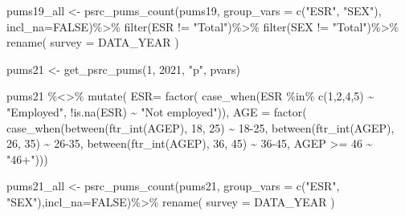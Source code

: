 \documentclass[
  12pt,
]{article}
\newenvironment{Shaded}{\begin{snugshade}}{\end{snugshade}}
\newcommand{\AttributeTok}[1]{\textcolor[rgb]{0.77,0.63,0.00}{#1}}
\newcommand{\ConstantTok}[1]{\textcolor[rgb]{0.00,0.00,0.00}{#1}}
\newcommand{\DecValTok}[1]{\textcolor[rgb]{0.00,0.00,0.81}{#1}}
\newcommand{\FunctionTok}[1]{\textcolor[rgb]{0.00,0.00,0.00}{#1}}
\newcommand{\NormalTok}[1]{#1}
\newcommand{\OtherTok}[1]{\textcolor[rgb]{0.56,0.35,0.01}{#1}}
\newcommand{\SpecialCharTok}[1]{\textcolor[rgb]{0.00,0.00,0.00}{#1}}
\newcommand{\StringTok}[1]{\textcolor[rgb]{0.31,0.60,0.02}{#1}}
\begin{document}
\begin{Shaded}
\begin{Highlighting}[]
\NormalTok{pums19\_all }\OtherTok{\textless{}{-}} \FunctionTok{psrc\_pums\_count}\NormalTok{(pums19, }\AttributeTok{group\_vars =} \FunctionTok{c}\NormalTok{(}\StringTok{"ESR"}\NormalTok{, }\StringTok{"SEX"}\NormalTok{), }\AttributeTok{incl\_na=}\ConstantTok{FALSE}\NormalTok{)}\SpecialCharTok{\%\textgreater{}\%}
  \FunctionTok{filter}\NormalTok{(ESR }\SpecialCharTok{!=} \StringTok{"Total"}\NormalTok{)}\SpecialCharTok{\%\textgreater{}\%}
  \FunctionTok{filter}\NormalTok{(SEX }\SpecialCharTok{!=} \StringTok{"Total"}\NormalTok{)}\SpecialCharTok{\%\textgreater{}\%}
  \FunctionTok{rename}\NormalTok{(}
    \AttributeTok{survey =}\NormalTok{ DATA\_YEAR}
\NormalTok{  )}

\NormalTok{pums21 }\OtherTok{\textless{}{-}} \FunctionTok{get\_psrc\_pums}\NormalTok{(}\DecValTok{1}\NormalTok{, }\DecValTok{2021}\NormalTok{, }\StringTok{"p"}\NormalTok{, pvars) }

\NormalTok{pums21 }\SpecialCharTok{\%\textless{}\textgreater{}\%} \FunctionTok{mutate}\NormalTok{(}
  \AttributeTok{ESR=} \FunctionTok{factor}\NormalTok{(}
    \FunctionTok{case\_when}\NormalTok{(ESR }\SpecialCharTok{\%in\%} \FunctionTok{c}\NormalTok{(}\DecValTok{1}\NormalTok{,}\DecValTok{2}\NormalTok{,}\DecValTok{4}\NormalTok{,}\DecValTok{5}\NormalTok{) }\SpecialCharTok{\textasciitilde{}} \StringTok{"Employed"}\NormalTok{,}
              \SpecialCharTok{!}\FunctionTok{is.na}\NormalTok{(ESR) }\SpecialCharTok{\textasciitilde{}} \StringTok{"Not employed"}\NormalTok{)),}
  \AttributeTok{AGE =} \FunctionTok{factor}\NormalTok{(}
    \FunctionTok{case\_when}\NormalTok{(}\FunctionTok{between}\NormalTok{(}\FunctionTok{ftr\_int}\NormalTok{(AGEP), }\DecValTok{18}\NormalTok{, }\DecValTok{25}\NormalTok{) }\SpecialCharTok{\textasciitilde{}} \StringTok{\textquotesingle{}18{-}25\textquotesingle{}}\NormalTok{,}
              \FunctionTok{between}\NormalTok{(}\FunctionTok{ftr\_int}\NormalTok{(AGEP), }\DecValTok{26}\NormalTok{, }\DecValTok{35}\NormalTok{) }\SpecialCharTok{\textasciitilde{}} \StringTok{\textquotesingle{}26{-}35\textquotesingle{}}\NormalTok{,}
              \FunctionTok{between}\NormalTok{(}\FunctionTok{ftr\_int}\NormalTok{(AGEP), }\DecValTok{36}\NormalTok{, }\DecValTok{45}\NormalTok{) }\SpecialCharTok{\textasciitilde{}} \StringTok{\textquotesingle{}36{-}45\textquotesingle{}}\NormalTok{,}
\NormalTok{              AGEP }\SpecialCharTok{\textgreater{}=} \DecValTok{46} \SpecialCharTok{\textasciitilde{}} \StringTok{"46+"}\NormalTok{)))}

\NormalTok{pums21\_all }\OtherTok{\textless{}{-}} \FunctionTok{psrc\_pums\_count}\NormalTok{(pums21, }\AttributeTok{group\_vars =} \FunctionTok{c}\NormalTok{(}\StringTok{"ESR"}\NormalTok{, }\StringTok{"SEX"}\NormalTok{),}\AttributeTok{incl\_na=}\ConstantTok{FALSE}\NormalTok{)}\SpecialCharTok{\%\textgreater{}\%}
  \FunctionTok{rename}\NormalTok{(}
    \AttributeTok{survey =}\NormalTok{ DATA\_YEAR}
\NormalTok{  )}





\end{Highlighting}
\end{Shaded}
\end{document}
